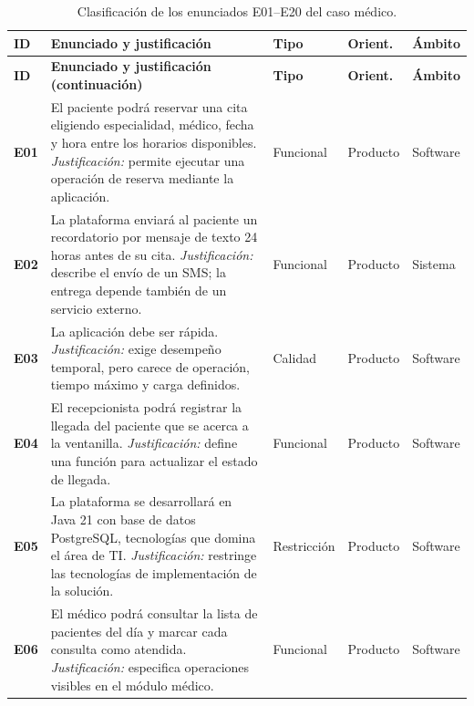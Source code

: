 \documentclass[12pt,a4paper]{article}
\begin{document}
\begin{longtable}{|p{0.72cm}|p{6.85cm}|p{2.00cm}|p{1.65cm}|p{1.75cm}|}
\caption{Clasificación de los enunciados E01--E20 del caso médico.}
\label{tab:enunciados}\\
\hline
\textbf{ID} & \textbf{Enunciado y justificación} & \textbf{Tipo} & \textbf{Orient.} & \textbf{Ámbito}\\
\hline
\endfirsthead

\hline
\textbf{ID} & \textbf{Enunciado y justificación (continuación)} & \textbf{Tipo} & \textbf{Orient.} & \textbf{Ámbito}\\
\hline
\endhead

\hline
\endfoot

\textbf{E01} &
El paciente podrá reservar una cita eligiendo especialidad, médico, fecha y hora entre los horarios disponibles.
\emph{Justificación:} permite ejecutar una operación de reserva mediante la aplicación.
& Funcional & Producto & Software\\ \hline

\textbf{E02} &
La plataforma enviará al paciente un recordatorio por mensaje de texto 24 horas antes de su cita.
\emph{Justificación:} describe el envío de un SMS; la entrega depende también de un servicio externo.
& Funcional & Producto & Sistema\\ \hline

\textbf{E03} &
La aplicación debe ser rápida.
\emph{Justificación:} exige desempeño temporal, pero carece de operación, tiempo máximo y carga definidos.
& Calidad & Producto & Software\\ \hline

\textbf{E04} &
El recepcionista podrá registrar la llegada del paciente que se acerca a la ventanilla.
\emph{Justificación:} define una función para actualizar el estado de llegada.
& Funcional & Producto & Software\\ \hline

\textbf{E05} &
La plataforma se desarrollará en Java 21 con base de datos PostgreSQL, tecnologías que domina el área de TI.
\emph{Justificación:} restringe las tecnologías de implementación de la solución.
& Restricción & Producto & Software\\ \hline

\textbf{E06} &
El médico podrá consultar la lista de pacientes del día y marcar cada consulta como atendida.
\emph{Justificación:} especifica operaciones visibles en el módulo médico.
& Funcional & Producto & Software\\ \hline


\end{longtable}
\end{document}
